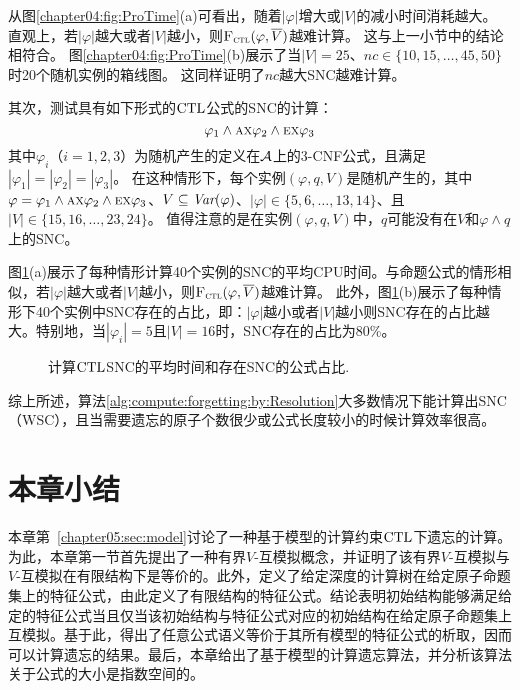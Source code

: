 从图\ref{chapter04:fig:ProTime}(a)可看出，随着$|\varphi|$增大或$|V|$的减小时间消耗越大。
直观上，若$|\varphi|$越大或者$|V|$越小，则${\textsc{F}_{\textsc{ctl}}}(\varphi, \overline{V})$越难计算。
这与上一小节中的结论相符合。
图\ref{chapter04:fig:ProTime}(b)展示了当$|V|= 25$、$nc\in \{10,15,\dots, 45, 50\}$时20个随机实例的箱线图。
这同样证明了$nc$越大SNC越难计算。


其次，测试具有如下形式的$\textrm{CTL}$公式的SNC的计算：
$$\varphi_1 \wedge \textsc{a} \textsc{x} \varphi_2 \wedge \textsc{e}\textsc{x} \varphi_3$$
其中$\varphi_i$（$i=1,2,3$）为随机产生的定义在${\cal A}$上的3-CNF公式，且满足$|\varphi_1|=|\varphi_2|=|\varphi_3|$。
在这种情形下，每个实例$(\varphi, q, V)$是随机产生的，其中$\varphi=\varphi_1 \wedge \textsc{a} \textsc{x} \varphi_2 \wedge \textsc{e}\textsc{x} \varphi_3$、$V\subseteq \textit{Var}(\varphi)$、$|\varphi|\in \{5,6,\dots, 13,14\}$、且$|V|\in \{15,16,\dots, 23,24\}$。
值得注意的是在实例$(\varphi, q, V)$中，$q$可能没有在$V$和$\varphi\wedge q$上的SNC。

图\ref{chapter04:fig:CtlTime}(a)展示了每种情形计算40个实例的SNC的平均CPU时间。与命题公式的情形相似，若$|\varphi|$越大或者$|V|$越小，则${\textsc{F}_{\textsc{ctl}}}(\varphi, \overline{V})$越难计算。
此外，图\ref{chapter04:fig:CtlTime}(b)展示了每种情形下40个实例中SNC存在的占比，即：$|\varphi|$越小或者$|V|$越小则SNC存在的占比越大。特别地，当$|\varphi_i|=5$且$|V|=16$时，SNC存在的占比为80\%。



\begin{figure*}[!htb]
	\centering
	\caption{计算$\textrm{CTL}$SNC的平均时间和存在SNC的公式占比.}
	\label{chapter04:fig:CtlTime}
\end{figure*}

综上所述，算法\ref{alg:compute:forgetting:by:Resolution}大多数情况下能计算出SNC（WSC），且当需要遗忘的原子个数很少或公式长度较小的时候计算效率很高。


\section{本章小结} 
本章第~\ref{chapter05:sec:model}讨论了一种基于模型的计算约束$\textrm{CTL}$下遗忘的计算。为此，本章第一节首先提出了一种有界$V$-互模拟概念，并证明了该有界$V$-互模拟与$V$-互模拟在有限结构下是等价的。此外，定义了给定深度的计算树在给定原子命题集上的特征公式，由此定义了有限结构的特征公式。结论表明初始结构能够满足给定的特征公式当且仅当该初始结构与特征公式对应的初始结构在给定原子命题集上互模拟。基于此，得出了任意公式语义等价于其所有模型的特征公式的析取，因而可以计算遗忘的结果。最后，本章给出了基于模型的计算遗忘算法，并分析该算法关于公式的大小是指数空间的。

